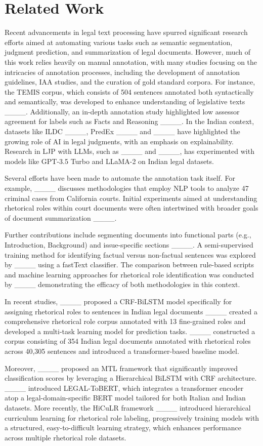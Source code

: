 \section{Related Work}
Recent advancements in legal text processing have spurred significant research efforts aimed at automating various tasks such as semantic segmentation, judgment prediction, and summarization of legal documents. However, much of this work relies heavily on manual annotation, with many studies focusing on the intricacies of annotation processes, including the development of annotation guidelines, IAA studies, and the curation of gold standard corpora. For instance, the TEMIS corpus, which consists of 504 sentences annotated both syntactically and semantically, was developed to enhance understanding of legislative texts ____. Additionally, an in-depth annotation study highlighted low assessor agreement for labels such as Facts and Reasoning ____. In the Indian context, datasets like ILDC ____, PredEx ____ and ____ have highlighted the growing role of AI in legal judgments, with an emphasis on explainability. Research in LJP with LLMs, such as ____ and ____, has experimented with models like GPT-3.5 Turbo and LLaMA-2 on Indian legal datasets. 

Several efforts have been made to automate the annotation task itself. For example, ____ discusses methodologies that employ NLP tools to analyze 47 criminal cases from California courts. Initial experiments aimed at understanding rhetorical roles within court documents were often intertwined with broader goals of document summarization ____. 

Further contributions include segmenting documents into functional parts (e.g., Introduction, Background) and issue-specific sections ____. A semi-supervised training method for identifying factual versus non-factual sentences was explored by ____ using a fastText classifier. The comparison between rule-based scripts and machine learning approaches for rhetorical role identification was conducted by ____ demonstrating the efficacy of both methodologies in this context.

In recent studies, ____ proposed a CRF-BiLSTM model specifically for assigning rhetorical roles to sentences in Indian legal documents ____ created a comprehensive rhetorical role corpus annotated with 13 fine-grained roles and developed a multi-task learning model for prediction tasks. ____ constructed a corpus consisting of 354 Indian legal documents annotated with rhetorical roles across 40,305 sentences and introduced a transformer-based baseline model.

Moreover, ____ proposed an MTL framework that significantly improved classification scores by leveraging a Hierarchical BiLSTM with CRF architecture. ____ introduced LEGAL-ToBERT, which integrates a transformer encoder atop a legal-domain-specific BERT model tailored for both Italian and Indian datasets. More recently, the HiCuLR framework ____ introduced hierarchical curriculum learning for rhetorical role labeling, progressively training models with a structured, easy-to-difficult learning strategy, which enhances performance across multiple rhetorical role datasets.